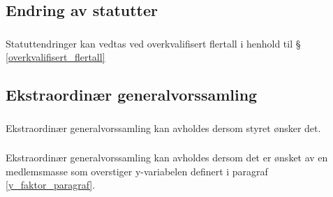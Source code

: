 \documentclass{article}
\newenvironment{statute}[1][]
    {
        \titleformat{\subsubsection}[runin]{\normalfont}{\hspace{1pt}\textit{\S\hspace{5pt}\thesubsubsection}}{0pt}{\rule{4pt}{0pt}}{}
        \subsubsection{}#1
        \begin{minipage}[t]{0.9\linewidth}
    }
    {
        \end{minipage}
        
        \ignorespacesafterend
    }
\begin{document}
        \subsection{Endring av statutter}
            \begin{statute}
                Statuttendringer kan vedtas ved overkvalifisert flertall i henhold til \S\hspace{3pt}  \ref{overkvalifisert_flertall}
            \end{statute}
            
        \subsection{Ekstraordinær generalvorssamling}
            \begin{statute}
                Ekstraordinær generalvorssamling kan avholdes dersom styret ønsker det.
            \end{statute}
            \begin{statute}
                Ekstraordinær generalvorssamling kan avholdes dersom det er ønsket av en medlemsmasse som overstiger y-variabelen definert i paragraf \ref{y_faktor_paragraf}.
            \end{statute}
\end{document}
